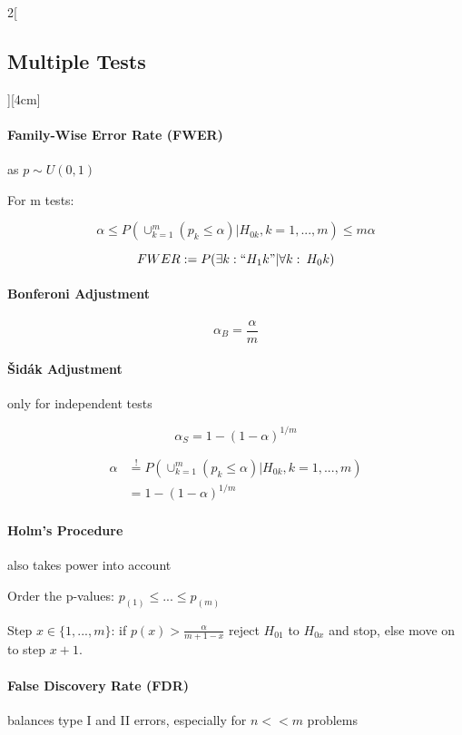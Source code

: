\documentclass[8pt]{extarticle}
\begin{document}
\begin{multicols}{2}[\subsection{Multiple Tests}][4cm]

\paragraph{Family-Wise Error Rate (FWER)} 
as $p \sim U(0,1)$

For m tests:

$$\alpha \leq P\left(\cup_{k=1}^m (p_k \leq \alpha)| H_{0k},k=1,...,m\right) \leq m\alpha$$

$$FWER := P(\exists k: ``H_1k"|\forall k:\: H_0k)$$


\paragraph{Bonferoni Adjustment} 

$$\alpha_{B} = \frac{\alpha}{m}$$

\paragraph{\v{S}id\'{a}k Adjustment} only for independent tests

$$\alpha_{S} = 1- (1-\alpha)^{1/m}$$

\begin{Proof}
\vspace{-1.5em}
\begin{align*}
 \alpha &\overset{!}{=} P\left(\cup_{k=1}^m (p_k \leq \alpha)| H_{0k},k=1,...,m\right)\\
 &= 1- (1-\alpha)^{1/m}
\end{align*}
\end{Proof}

\paragraph{Holm's Procedure} also takes power into account

\noindent Order the p-values: $p_{(1)} \leq...\leq p_{(m)} $

\noindent Step $x \in \{1,...,m\}$: if $p(x) > \frac{\alpha}{m + 1 - x}$ reject $H_{01}$ to $H_{0x}$ and stop, else move on to step $x+1$. 

\paragraph{False Discovery Rate (FDR)} balances type I and II errors, especially for $n<<m$ problems


\end{multicols}
\end{document}
